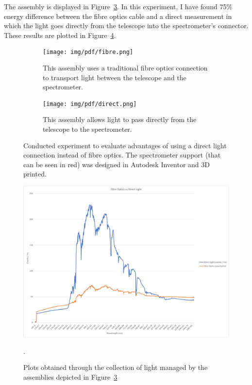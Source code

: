 The assembly is displayed in Figure~\ref{fig:direct_vs_optical_assmbly}.
In this experiment, I have found 75\% energy difference between the
fibre optics cable and a direct measurement in which the light goes
directly from the telescope into the spectrometer's connector. These
results are plotted in Figure~\ref{fig:direct_vs_optical_plot}.

\begin{figure}[htpb]
    \centering
    \begin{subfigure}{.45\textwidth}
        \texttt{[image: img/pdf/fibre.png]}
        \caption{This assembly uses a traditional fibre optics
        connection to transport light between the telescope and the
        spectrometer.}
        \label{fig:fo_light}
    \end{subfigure}
    \hfill
    \begin{subfigure}{.45\textwidth}
        \texttt{[image: img/pdf/direct.png]}
        \caption{This assembly allows light to pass directly from the
        telescope to the spectrometer.}
        \label{fig:direct_light}
    \end{subfigure}
    \caption{Conducted experiment to evaluate advantages of using a
    direct light connection instead of fibre optics. The spectrometer
    support (that can be seen in red) was designed in Autodesk Inventor and
    3D printed.}%
    \label{fig:direct_vs_optical_assmbly}
\end{figure}

\begin{figure}[htpb]
    \centering
    \includegraphics[width=.8\textwidth]{img/pdf/comparison_direct_fibreoptics.pdf}
    \caption{Plots obtained through the collection of light managed by
    the assemblies depicted in
    Figure~\ref{fig:direct_vs_optical_assmbly}}.%
    \label{fig:direct_vs_optical_plot}
\end{figure}

